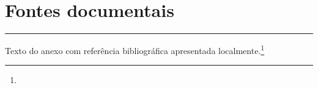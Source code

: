 \documentclass{ufctex}
\begin{document}
\textual

\section{Fontes documentais}

\begin{ufcobjeto}[here]
  \rule{6cm}{2cm}
\end{ufcobjeto}

Texto do anexo com referência bibliográfica apresentada localmente.\footnote{}
\end{document}
